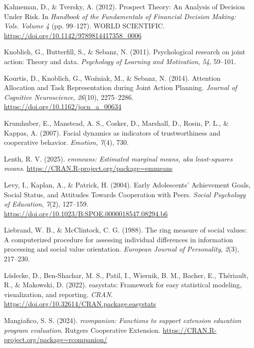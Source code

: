 \documentclass[
  man,
  floatsintext,
  longtable,
  nolmodern,
  notxfonts,
  notimes,
  colorlinks=true,linkcolor=blue,citecolor=blue,urlcolor=blue]{apa7}
\newlength{\cslhangindent}
\newenvironment{CSLReferences}[2] %
 {\begin{list}{}{%
  \setlength{\itemindent}{0pt}
  \setlength{\leftmargin}{0pt}
  \setlength{\parsep}{0pt}
  \ifodd #1
   \setlength{\leftmargin}{\cslhangindent}
   \setlength{\itemindent}{-1\cslhangindent}
  \fi
  \setlength{\itemsep}{#2\baselineskip}}}
 {\end{list}}
\begin{document}
\begin{CSLReferences}{1}{0}
Kahneman, D., \& Tversky, A. (2012). Prospect {Theory}: {An Analysis} of
{Decision Under Risk}. In \emph{Handbook of the {Fundamentals} of
{Financial Decision Making}: Vols. Volume 4} (pp. 99--127). WORLD
SCIENTIFIC. \url{https://doi.org/10.1142/9789814417358_0006}

Knoblich, G., Butterfill, S., \& Sebanz, N. (2011). Psychological
research on joint action: Theory and data. \emph{Psychology of Learning
and Motivation}, \emph{54}, 59--101.

Kourtis, D., Knoblich, G., Woźniak, M., \& Sebanz, N. (2014). Attention
{Allocation} and {Task Representation} during {Joint Action Planning}.
\emph{Journal of Cognitive Neuroscience}, \emph{26}(10), 2275--2286.
\url{https://doi.org/10.1162/jocn_a_00634}

Krumhuber, E., Manstead, A. S., Cosker, D., Marshall, D., Rosin, P. L.,
\& Kappas, A. (2007). Facial dynamics as indicators of trustworthiness
and cooperative behavior. \emph{Emotion}, \emph{7}(4), 730.

Lenth, R. V. (2025). \emph{{emmeans}: Estimated marginal means, aka
least-squares means}. \url{https://CRAN.R-project.org/package=emmeans}

Levy, I., Kaplan, A., \& Patrick, H. (2004). Early {Adolescents}'
{Achievement Goals}, {Social Status}, and {Attitudes Towards
Cooperation} with {Peers}. \emph{Social Psychology of Education},
\emph{7}(2), 127--159.
\url{https://doi.org/10.1023/B:SPOE.0000018547.08294.b6}

Liebrand, W. B., \& McClintock, C. G. (1988). The ring measure of social
values: {A} computerized procedure for assessing individual differences
in information processing and social value orientation. \emph{European
Journal of Personality}, \emph{2}(3), 217--230.

Lüdecke, D., Ben-Shachar, M. S., Patil, I., Wiernik, B. M., Bacher, E.,
Thériault, R., \& Makowski, D. (2022). {easystats}: Framework for easy
statistical modeling, visualization, and reporting. \emph{CRAN}.
\url{https://doi.org/10.32614/CRAN.package.easystats}

Mangiafico, S. S. (2024). \emph{{rcompanion}: Functions to support
extension education program evaluation}. Rutgers Cooperative Extension.
\url{https://CRAN.R-project.org/package=rcompanion/}


\end{CSLReferences}
\end{document}
